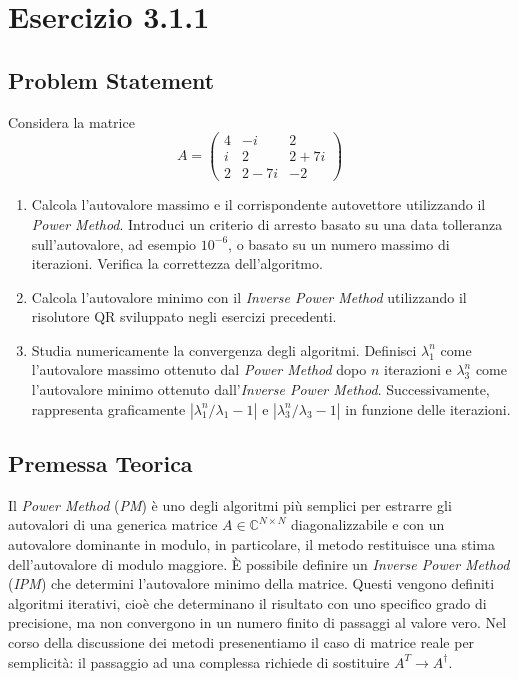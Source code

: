 
\section{Esercizio 3.1.1}
\subsection{Problem Statement}

Considera la matrice
\[
A = \begin{pmatrix}
4 & -i & 2 \\
i & 2 & 2 + 7i \\
2 & 2 - 7i & -2
\end{pmatrix}
\]

\begin{enumerate}
    \item Calcola l'autovalore massimo e il corrispondente autovettore utilizzando il \textit{Power Method}. Introduci un criterio di arresto basato su una data tolleranza sull'autovalore, ad esempio $10^{-6}$, o basato su un numero massimo di iterazioni. Verifica la correttezza dell'algoritmo.
    
    \item Calcola l'autovalore minimo con il \textit{Inverse Power Method} utilizzando il risolutore QR sviluppato negli esercizi precedenti.
    
    \item Studia numericamente la convergenza degli algoritmi. Definisci $\lambda_1^n$ come l'autovalore massimo ottenuto dal \textit{Power Method} dopo $n$ iterazioni e $\lambda_3^n$ come l'autovalore minimo ottenuto dall'\textit{Inverse Power Method}. Successivamente, rappresenta graficamente $|\lambda_1^n / \lambda_1 - 1|$ e $|\lambda_3^n / \lambda_3 - 1|$ in funzione delle iterazioni.
\end{enumerate}

\subsection{Premessa Teorica}
Il \textit{Power Method} (\textit{PM}) è uno degli algoritmi più semplici per estrarre gli autovalori di una generica matrice $A \in \mathbb{C}^{N \times N}$ diagonalizzabile e con un autovalore dominante in modulo, in particolare, il metodo restituisce una stima dell'autovalore di modulo maggiore. È possibile definire un \textit{Inverse Power Method} (\textit{IPM}) che determini l'autovalore minimo della matrice. Questi vengono definiti algoritmi iterativi, cioè che determinano il risultato con uno specifico grado di precisione, ma non convergono in un numero finito di passaggi al valore vero. Nel corso della discussione dei metodi presenentiamo il caso di matrice reale per semplicità: il passaggio ad una complessa richiede di sostituire $A^T \longrightarrow A^\dagger$.

